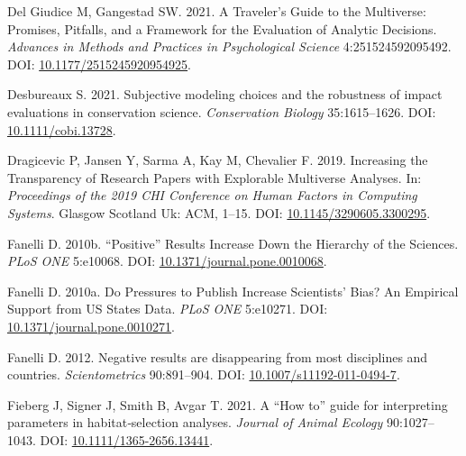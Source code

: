 \documentclass[10pt,a4paper]{article}
\newlength{\cslhangindent}
\newlength{\cslentryspacingunit} %
\newenvironment{CSLReferences}[2] %
 {%
  \setlength{\parindent}{0pt}
  \ifodd #1
  \let\oldpar\par
  \def\par{\hangindent=\cslhangindent\oldpar}
  \fi
  \setlength{\parskip}{#2\cslentryspacingunit}
 }%
 {}
\begin{document}
\begin{CSLReferences}{1}{0}
\leavevmode{}%
Del Giudice M, Gangestad SW. 2021. A {Traveler}'s {Guide} to the {Multiverse}: {Promises}, {Pitfalls}, and a {Framework} for the {Evaluation} of {Analytic} {Decisions}. \emph{Advances in Methods and Practices in Psychological Science} 4:251524592095492. DOI: \href{https://doi.org/10.1177/2515245920954925}{10.1177/2515245920954925}.

\leavevmode{}%
Desbureaux S. 2021. Subjective modeling choices and the robustness of impact evaluations in conservation science. \emph{Conservation Biology} 35:1615--1626. DOI: \href{https://doi.org/10.1111/cobi.13728}{10.1111/cobi.13728}.

\leavevmode{}%
Dragicevic P, Jansen Y, Sarma A, Kay M, Chevalier F. 2019. Increasing the {Transparency} of {Research} {Papers} with {Explorable} {Multiverse} {Analyses}. In: \emph{Proceedings of the 2019 {CHI} {Conference} on {Human} {Factors} in {Computing} {Systems}}. Glasgow Scotland Uk: ACM, 1--15. DOI: \href{https://doi.org/10.1145/3290605.3300295}{10.1145/3290605.3300295}.

\leavevmode{}%
Fanelli D. 2010b. {``{Positive}''} {Results} {Increase} {Down} the {Hierarchy} of the {Sciences}. \emph{PLoS ONE} 5:e10068. DOI: \href{https://doi.org/10.1371/journal.pone.0010068}{10.1371/journal.pone.0010068}.

\leavevmode{}%
Fanelli D. 2010a. Do {Pressures} to {Publish} {Increase} {Scientists}' {Bias}? {An} {Empirical} {Support} from {US} {States} {Data}. \emph{PLoS ONE} 5:e10271. DOI: \href{https://doi.org/10.1371/journal.pone.0010271}{10.1371/journal.pone.0010271}.

\leavevmode{}%
Fanelli D. 2012. Negative results are disappearing from most disciplines and countries. \emph{Scientometrics} 90:891--904. DOI: \href{https://doi.org/10.1007/s11192-011-0494-7}{10.1007/s11192-011-0494-7}.

\leavevmode{}%
Fieberg J, Signer J, Smith B, Avgar T. 2021. A {``{How} to''} guide for interpreting parameters in habitat‐selection analyses. \emph{Journal of Animal Ecology} 90:1027--1043. DOI: \href{https://doi.org/10.1111/1365-2656.13441}{10.1111/1365-2656.13441}.


\end{CSLReferences}
\end{document}
